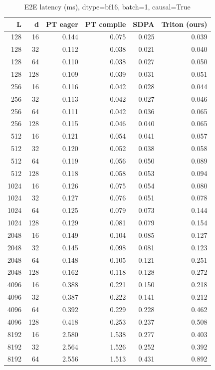 \documentclass[11pt]{article}
\begin{document}
\begin{table}[H]\small\centering
\caption{E2E latency (ms), dtype=bf16, batch=1, causal=True}
\label{tab:fa2-bf16-e2e}
\begin{tabular}{rrrrrr}
\toprule
L & d & PT eager & PT compile & SDPA & Triton (ours) \\
\midrule
128 & 16 & 0.144 & 0.075 & 0.025 & 0.039 \\
128 & 32 & 0.112 & 0.038 & 0.021 & 0.040 \\
128 & 64 & 0.110 & 0.038 & 0.027 & 0.050 \\
128 & 128 & 0.109 & 0.039 & 0.031 & 0.051 \\
256 & 16 & 0.116 & 0.042 & 0.028 & 0.044 \\
256 & 32 & 0.113 & 0.042 & 0.027 & 0.046 \\
256 & 64 & 0.111 & 0.042 & 0.036 & 0.065 \\
256 & 128 & 0.115 & 0.046 & 0.040 & 0.065 \\
512 & 16 & 0.121 & 0.054 & 0.041 & 0.057 \\
512 & 32 & 0.120 & 0.052 & 0.038 & 0.058 \\
512 & 64 & 0.119 & 0.056 & 0.050 & 0.089 \\
512 & 128 & 0.118 & 0.058 & 0.053 & 0.094 \\
1024 & 16 & 0.126 & 0.075 & 0.054 & 0.080 \\
1024 & 32 & 0.127 & 0.076 & 0.051 & 0.078 \\
1024 & 64 & 0.125 & 0.079 & 0.073 & 0.144 \\
1024 & 128 & 0.129 & 0.081 & 0.079 & 0.154 \\
2048 & 16 & 0.149 & 0.104 & 0.085 & 0.127 \\
2048 & 32 & 0.145 & 0.098 & 0.081 & 0.123 \\
2048 & 64 & 0.148 & 0.105 & 0.121 & 0.251 \\
2048 & 128 & 0.162 & 0.118 & 0.128 & 0.272 \\
4096 & 16 & 0.388 & 0.221 & 0.150 & 0.218 \\
4096 & 32 & 0.387 & 0.222 & 0.141 & 0.212 \\
4096 & 64 & 0.392 & 0.229 & 0.228 & 0.462 \\
4096 & 128 & 0.418 & 0.253 & 0.237 & 0.508 \\
8192 & 16 & 2.580 & 1.538 & 0.277 & 0.403 \\
8192 & 32 & 2.564 & 1.526 & 0.252 & 0.392 \\
8192 & 64 & 2.556 & 1.513 & 0.431 & 0.892 \\

\end{tabular}
\end{table}
\end{document}
